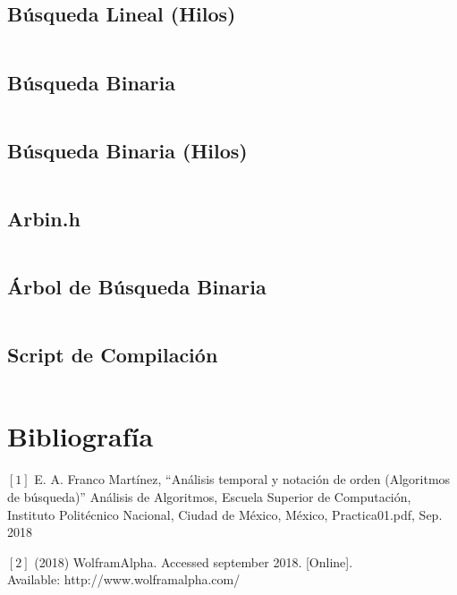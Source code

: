 \documentclass[12pt]{article}
\begin{document}
		 \subsection{Búsqueda Lineal (Hilos)}
		    \inputminted{c++}{Code/LinealHilos.c}
		    
		 \subsection{Búsqueda Binaria}
		    \inputminted{c++}{Code/Binaria.c}
		 
		 \subsection{Búsqueda Binaria (Hilos)}
		    \inputminted{c++}{Code/BinariaHilos.c}
		 
		 \subsection{Arbin.h}
		    \inputminted{c++}{Code/Arbin.h}
		 
		 \subsection{Árbol de Búsqueda Binaria}
		    \inputminted{c++}{Code/ABB.c}
		 
		 \subsection{Script de Compilación}
		 \inputminted{c++}{Code/script.c}

	
	\section{Bibliografía}
	
	$[1]$ E. A. Franco Martínez, “Análisis temporal y notación de orden (Algoritmos de búsqueda)” Análisis de Algoritmos, Escuela Superior de Computación, Instituto Politécnico Nacional,
    Ciudad de México, México, Practica01.pdf, Sep. 2018
  
    $[2]$ (2018) WolframAlpha. Accessed september 2018. [Online]. \\Available: http://www.wolframalpha.com/

	\nocite{ref2}
	
     
\end{document}
